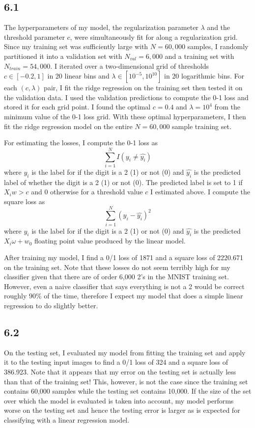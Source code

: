 \documentclass[12pt]{amsart}
\begin{document}
\subsection*{6.1}

The hyperparameters of my model, the regularization parameter $\lambda$ and the threshold parameter $c$, were simultaneously fit for along a regularization grid.  Since my training set was sufficiently large with $N = 60,000$ samples, I randomly partitioned it into a validation set with $N_{val} = 6,000$ and a training set with $N_{train} = 54,000$.  I iterated over a two-dimensional grid of thresholds $c \in [-0.2,1]$ in 20 linear bins and $\lambda \in [10^{-5},10^{10}]$ in 20 logarithmic bins.  For each $(c,\lambda)$ pair, I fit the ridge regression on the training set then tested it on the validation data.  I used the validation predictions to compute the 0-1 loss and stored it for each grid point.  I found the optimal $c = 0.4$ and $\lambda = 10^4$ from the minimum value of the 0-1 loss grid.  With these optimal hyperparameters, I then fit the ridge regression model on the entire $N = 60,000$ sample training set.

For estimating the losses, I compute the 0-1 loss as
\begin{equation} \label{eqn:01_loss}
\sum_{i=1}^N I(y_i \neq \hat{y_i})
\end{equation}
where $y_i$ is the label for if the digit is a 2 (1) or not (0) and $\hat{y_i}$ is the predicted label of whether the digit is a 2 (1) or not (0).  The predicted label is set to 1 if $X_iw > c$ and 0 otherwise for a threshold value $c$ I estimated above.  I compute the square loss as
\begin{equation} \label{eqn:square_loss}
\sum_{i=1}^N (y_i - \hat{y_i})^2
\end{equation}
where $y_i$ is the label for if the digit is a 2 (1) or not (0) and $\hat{y_i}$ is the predicted $X_i \omega + w_0$ floating point value produced by the linear model.

After training my model, I find a 0/1 loss of 1871 and a square loss of 2220.671 on the training set.  Note that these losses do not seem terribly high for my classifier given that there are of order 6,000 2's in the MNIST training set.  However, even a naive classifier that says everything is not a 2 would be correct roughly $90\%$ of the time, therefore I expect my model that does a simple linear regression to do slightly better.

\subsection*{6.2}
On the testing set, I evaluated my model from fitting the training set and apply it to the testing input images to find a 0/1 loss of 324 and a square loss of 386.923.  Note that it appears that my error on the testing set is actually less than that of the training set!  This, however, is not the case since the training set contains 60,000 samples while the testing set contains 10,000.  If the size of the set over which the model is evaluated is taken into account, my model performs worse on the testing set and hence the testing error is larger as is expected for classifying with a linear regression model.
\end{document}
